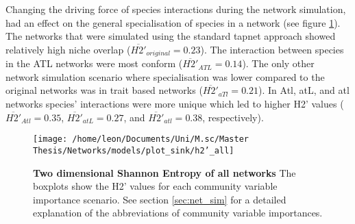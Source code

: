 \documentclass[12pt,a4paper]{article}
\begin{document}



Changing the driving force of species interactions during the network simulation, had an effect on the general specialisation of species in a network (see figure \ref{fig:h2}). The networks that were simulated using the standard tapnet approach showed relatively high niche overlap ($ \overline{H2'}_{original} = 0.23 $). The interaction between species in the ATL networks were most conform ($ \overline{H2'}_{ATL} = 0.14 $). The only other network simulation scenario where specialisation was lower compared to the original networks was in trait based networks ($ \overline{H2'}_{aTl} = 0.21 $). In Atl, atL, and atl networks species' interactions were more unique which led to higher H2' values ($ \overline{H2'}_{Atl} = 0.35 $, $ \overline{H2'}_{atL} = 0.27 $, and $ \overline{H2'}_{atl} = 0.38 $, respectively).

\begin{figure}[H]
	 \centering
	 \texttt{[image: /home/leon/Documents/Uni/M.sc/Master Thesis/Networks/models/plot\_sink/h2'\_all]}
	 \captionsetup{width = .8\textwidth}
	 \caption{\textbf{Two dimensional Shannon Entropy of all networks} The boxplots show the H2' values \parencite{Bluethgen2006} for each community variable importance scenario. See section \ref{sec:net_sim} for a detailed explanation of the abbreviations of community variable importances.}
	 \label{fig:h2}
\end{figure}
\end{document}

